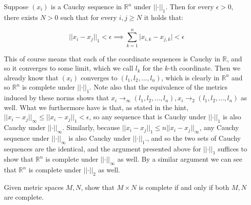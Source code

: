 \begin{solution}

    Suppose $(x_i)$ is a Cauchy sequence in $\mathbb{R}^n$ under $\lvert \lvert \cdot \rvert \rvert_1$.
    Then for every $\epsilon > 0$, there exists $N > 0$ such that for every $i, j \geq N$ it holds that:

    \[\lvert \lvert x_i - x_j \rvert \rvert_1 < \epsilon \implies \sum_{k=1}^{n}\lvert x_{i,k} - x_{j, k} \rvert < \epsilon\]

    This of course means that each of the coordinate sequences is Cauchy in $\mathbb{R}$, and so it converges to some limit, which we call $l_k$ for the $k$-th coordinate.
    Then we already know that $(x_i)$ converges to $(l_1, l_2, \ldots, l_n)$, which is clearly in $\mathbb{R}^n$ and so $\mathbb{R}^n$ is complete under $\lvert \lvert \cdot \rvert \rvert_1$.
    Note also that the equivalence of the metrics induced by these norms shows that $x_i \rightarrow_{\infty} (l_1, l_2, \ldots, l_n), x_i \rightarrow_{2} (l_1, l_2, \ldots, l_n)$ as well.
    What we furthermore have is that, as stated in the hint, $\lvert \lvert x_i - x_j \rvert \rvert_{\infty} \leq \lvert \lvert x_i - x_j \rvert \rvert_1 < \epsilon$, so any sequence that is Cauchy under $\lvert \lvert \cdot \rvert \rvert_1$ is also Cauchy under $\lvert \lvert \cdot \rvert \rvert_{\infty}$.
    Similarly, because $\lvert \lvert x_i - x_j \rvert \rvert_1 \leq n \lvert \lvert x_i - x_j \rvert \rvert_{\infty}$, any Cauchy sequence under $\lvert \lvert \cdot \rvert \rvert_{\infty}$ is also Cauchy under $\lvert \lvert \cdot \rvert \rvert_1$., and so the two sets of Cauchy sequences are the identical, and the argument presented above for $\lvert \lvert \cdot \rvert \rvert_1$ suffices to show that $\mathbb{R}^n$ is complete under $\lvert \lvert \cdot \rvert \rvert_{\infty}$ as well.
    By a similar argument we can see that $\mathbb{R}^n$ is complete under $\lvert \lvert \cdot \rvert \rvert_2$ as well.
\end{solution}

\begin{exercise}{17}
    Given metric spaces $M, N$, show that $M \times N$ is complete if and only if both $M, N$ are complete.
\end{exercise}

